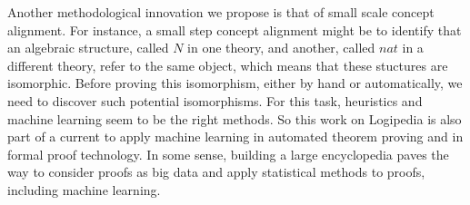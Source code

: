 Another methodological innovation we propose is that of small scale
concept alignment. For instance, a small step concept alignment might
be to identify that an algebraic structure, called $N$ in one theory,
and another, called $nat$ in a different theory, refer to the same
object, which means that these stuctures are isomorphic. Before
proving this isomorphism, either by hand or automatically, we need to
discover such potential isomorphisms. For this task, heuristics and
machine learning seem to be the right methods. So this work on
Logipedia is also part of a current to apply machine learning in
automated theorem proving and in formal proof technology. In some
sense, building a large encyclopedia paves the way to consider proofs
as big data and apply statistical methods to proofs, including machine
learning.

